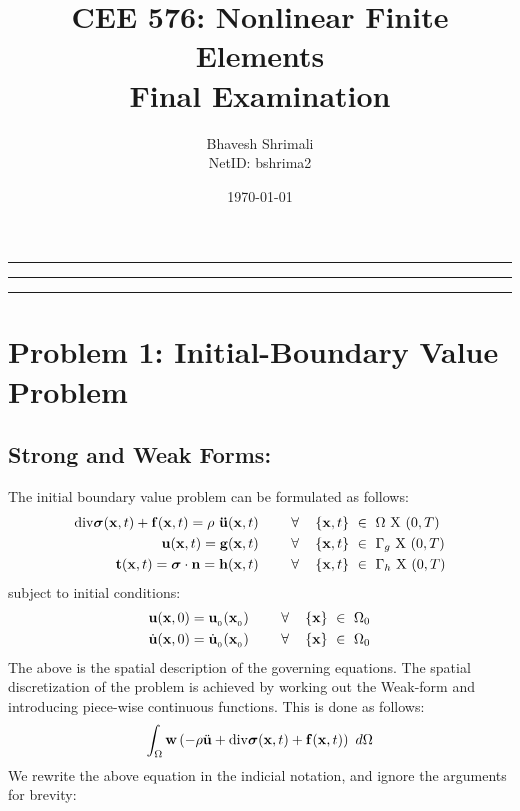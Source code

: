 
\usepackage{graphicx}
\title{\bf CEE 576: Nonlinear Finite Elements \\ Final Examination}
\author{Bhavesh Shrimali \\ NetID: bshrima2}
\date{\today}

\maketitle \hrule\hrule\hrule
\section*{Problem 1: Initial-Boundary Value Problem}
\subsection*{Strong and Weak Forms: }
The initial boundary value problem can be formulated as follows: 
\begin{align*}
{\rm div} 
{\bm \sigma} ({\bf x},t)
+ 
{\bf f}({\bf x},t)
=
\rho\ {\bf \ddot{u}} ({\bf x},t) \ \ \ \ \ \ \ \forall \ \ \ \left\{{\bf x},t\right\}\  & \in\  \Omega\  {\rm X}\  (0,T) \\
{\bf u} ({\bf x},t) = {\bf g}({\bf x},t) \ \ \ \ \ \ \ \forall \ \ \ \left\{ {\bf x},t \right\}\ & \in\ \Gamma_g\  {\rm X}\  (0,T)\\
{\bf t} ({\bf x},t)
=
{\bm\sigma}\cdot{\bf n}
= 
{\bf h}({\bf x},t)
 \ \ \ \ \ \ \ \forall \ \ \ \left\{ {\bf x},t \right\}\ & \in\ \Gamma_h\  {\rm X}\  (0,T)
\end{align*}
subject to initial conditions: 
\begin{align*}
{\bf u}
({\bf x},0)
 =
 {\bf u}_{_0} ({\bf x}_{_0})  \ \ \ \ \ \ \ \forall \ \ \ \left\{ {\bf x} \right\}\ & \in\ \Omega_0 \\
 \dot{\bf u}
({\bf x},0)
 =
 \dot{\bf u}_{_0} ({\bf x}_{_0})  \ \ \ \ \ \ \ \forall \ \ \ \left\{ {\bf x} \right\}\ & \in\ \Omega_0
\end{align*}
The above is the spatial description of the governing equations. The spatial discretization of the problem is achieved by working out the Weak-form and introducing piece-wise continuous functions. This is done as follows: 
\begin{align*}
\int_{\Omega}
{\bf w}
\left(
- \rho\ddot{\bf u}
+ {\rm div} 
{\bm \sigma} ({\bf x},t)
+ 
{\bf f}({\bf x},t)
\right)\ d\Omega
\end{align*} 
We rewrite the above equation in the indicial notation, and ignore the arguments for brevity: 
